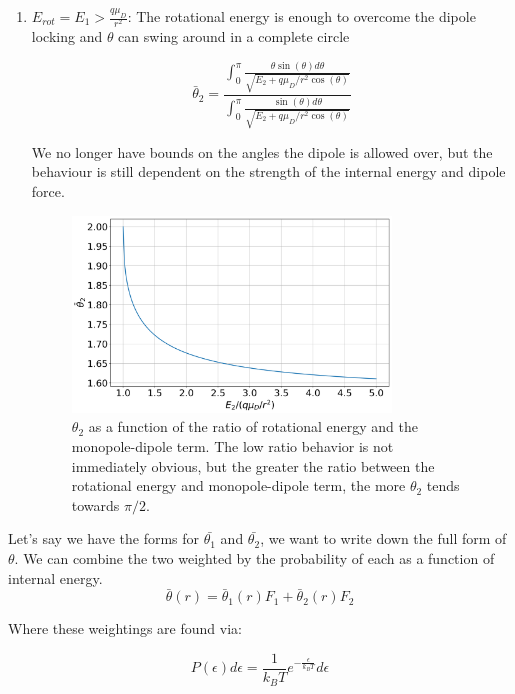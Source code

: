 \begin{enumerate}
	\item $E_{rot} = E_1 > \frac{q \mu_D}{r^2}$:
	The rotational energy is enough to overcome the dipole locking and $\theta$ can swing around in a complete circle

	\begin{equation}
	    \bar{\theta}_2  = \frac{\int_0^\pi \frac{\theta \sin(\theta) d\theta}{\sqrt{E_2 + q \mu_D/r^2 \cos(\theta)}}}{\int_0^\pi \frac{\sin(\theta) d \theta}{\sqrt{E_2 + q \mu_D/r^2 \cos(\theta)}}}
	\end{equation}

	We no longer have bounds on the angles the dipole is allowed over, but the behaviour is still dependent on the strength of the internal energy and dipole force.

	\begin{figure}[H]
		\label{fig: theta2}
		\centering
		\includegraphics[width=0.8\textwidth]{images/ADO_theta2.png}
		\caption{$\theta_2$ as a function of the ratio of rotational energy and the monopole-dipole term. The low ratio behavior is not immediately obvious, but the greater the ratio between the rotational energy and monopole-dipole term, the more $\theta_2$ tends towards $\pi/2$.}
	\end{figure}

\end{enumerate}

Let's say we have the forms for $\bar{\theta_1}$ and $\bar{\theta_2}$, we want to write down the full form of $\theta$. We can combine the two weighted by the probability of each as a function of internal energy.
\begin{equation*}
    \bar{\theta}(r) = \bar{\theta}_1(r) F_1 + \bar{\theta}_2(r) F_2
\end{equation*}

Where these weightings are found via:

\begin{equation*}
    P(\epsilon) d\epsilon = \frac{1}{k_BT}e^{-\frac{\epsilon}{k_BT}}d\epsilon
\end{equation*}

